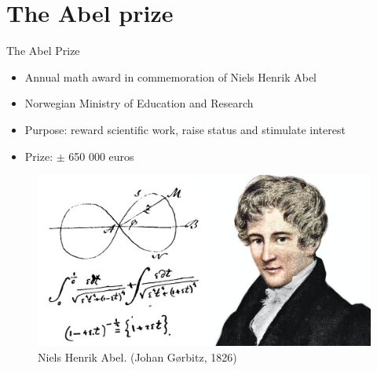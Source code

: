 \documentclass[]{beamer}
\begin{document}
\section{The Abel prize}
\begin{frame}{The Abel Prize}
    \begin{itemize}
        \item Annual math award in commemoration of Niels Henrik Abel
        \item Norwegian Ministry of Education and Research
        \item Purpose: reward scientific work, raise status and stimulate interest
        \item Prize: $\pm$ 650 000 euros
    \end{itemize}
\begin{figure}[htbp]
\centerline{\includegraphics[scale=.14]{Pictures/nielsabel.png}}
\caption{Niels Henrik Abel. (Johan Gørbitz, 1826)}
\label{fig}
\end{figure}
\end{frame}



\end{document}
